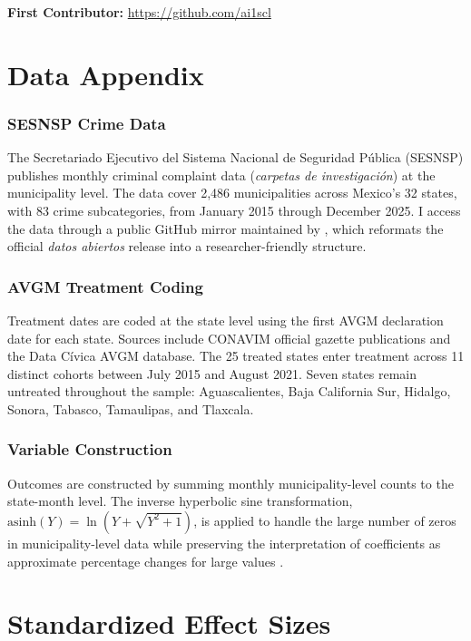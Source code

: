 \documentclass[12pt]{article}
\begin{document}
\noindent\textbf{First Contributor:} \url{https://github.com/ai1scl}

\label{apep_main_text_end}
\newpage


\newpage
\appendix

\section{Data Appendix}

\subsubsection*{SESNSP Crime Data} The Secretariado Ejecutivo del Sistema Nacional de Seguridad P\'ublica (SESNSP) publishes monthly criminal complaint data (\textit{carpetas de investigaci\'on}) at the municipality level. The data cover 2,486 municipalities across Mexico's 32 states, with 83 crime subcategories, from January 2015 through December 2025. I access the data through a public GitHub mirror maintained by \citet{lapanquecita2025}, which reformats the official \textit{datos abiertos} release into a researcher-friendly structure.

\subsubsection*{AVGM Treatment Coding} Treatment dates are coded at the state level using the first AVGM declaration date for each state. Sources include CONAVIM official gazette publications and the Data C\'ivica AVGM database. The 25 treated states enter treatment across 11 distinct cohorts between July 2015 and August 2021. Seven states remain untreated throughout the sample: Aguascalientes, Baja California Sur, Hidalgo, Sonora, Tabasco, Tamaulipas, and Tlaxcala.

\subsubsection*{Variable Construction} Outcomes are constructed by summing monthly municipality-level counts to the state-month level. The inverse hyperbolic sine transformation, $\text{asinh}(Y) = \ln(Y + \sqrt{Y^2 + 1})$, is applied to handle the large number of zeros in municipality-level data while preserving the interpretation of coefficients as approximate percentage changes for large values \citep{bellemare_wichman2020}.

\section{Standardized Effect Sizes}
\label{sec:sde}


\end{document}
